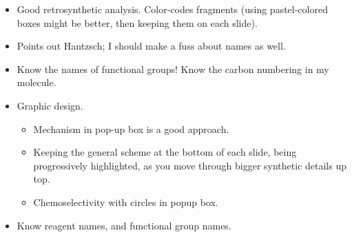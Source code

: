 \documentclass[../notes.tex]{subfiles}
\begin{document}
\begin{itemize}
\begin{itemize}
        \item Good retrosynthetic analysis. Color-codes fragments (using pastel-colored boxes might be better, then keeping them on each slide).
        \item Points out Hantzsch; I should make a fuss about names as well.
        \item Know the names of functional groups! Know the carbon numbering in my molecule.
        \item Graphic design.
        \begin{itemize}
            \item Mechanism in pop-up box is a good approach.
            \item Keeping the general scheme at the bottom of each slide, being progressively highlighted, as you move through bigger synthetic details up top.
            \item Chemoselectivity with circles in popup box.
        \end{itemize}
        \item Know reagent names, and functional group names.
    \end{itemize}
\end{itemize}
\end{document}
